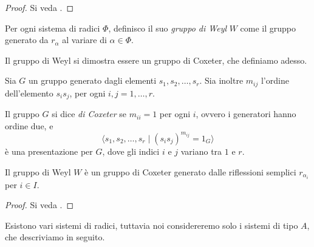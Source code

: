 \begin{proof}
    Si veda \cite[Proposition~20.1]{Bump2013LieGroups}.
\end{proof}

\begin{definition}
    Per ogni sistema di radici $\Phi$, definisco il suo \emph{gruppo di Weyl} $W$ come il
    gruppo generato da $r_\alpha$ al variare di $\alpha \in \Phi$.
\end{definition}

Il gruppo di Weyl si dimostra essere un gruppo di Coxeter, che definiamo adesso.

\begin{definition}

    Sia $G$ un gruppo generato dagli elementi $s_1, s_2, \dots, s_r$.
    Sia inoltre $m_{ij}$ l'ordine dell'elemento $s_i s_j$, per ogni $i,j = 1, \dots, r$.

    Il gruppo $G$ si dice \emph{di Coxeter} se $m_{ii} = 1$ per ogni $i$, ovvero
    i generatori hanno ordine due, e
    \[
        \label{eq:coxeter_pres}
        \bigl\langle s_1, s_2, \dots, s_r \mid (s_i s_j)^{m_{ij}} = 1_G \bigr\rangle
    \]
    \`e una presentazione per $G$, dove gli indici $i$ e $j$ variano tra $1$ e $r$.
    
\end{definition}

\begin{proposition}
    \label{prop:weyl_is_coxeter}
    Il gruppo di Weyl $W$ \`e un gruppo di Coxeter generato dalle riflessioni
    semplici $r_{\alpha_i}$ per $i \in I$.
\end{proposition}

\begin{proof}
    Si veda \cite[Theorem~25.1]{Bump2013LieGroups}.
\end{proof}

Esistono vari sistemi di radici, tuttavia noi considereremo solo i
sistemi di tipo $A$, che descriviamo in seguito.

